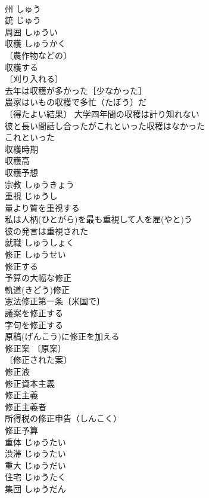 \documentclass[8pt]{extreport}
\begin{document}
\begin{CJK}{UTF8}{min}
\\	州	しゅう	
\\	銃	じゅう	
\\	周囲	しゅうい	
\\	収穫	しゅうかく	
\\	〔農作物などの〕
\\	収穫する 
\\	〔刈り入れる〕
\\	去年は収穫が多かった［少なかった］ 
\\	農家はいもの収穫で多忙（たぼう）だ 
\\	〔得たよい結果〕 大学四年間の収穫は計り知れない 
\\	彼と長い間話し合ったがこれといった収穫はなかった 
\\	これといった 
\\	収穫時期 
\\	収穫高 
\\	収穫予想 
\\	宗教	しゅうきょう	
\\	重視	じゅうし	
\\	量より質を重視する 
\\	私は人柄(ひとがら)を最も重視して人を雇(やと)う 
\\	彼の発言は重視された 
\\	就職	しゅうしょく	
\\	修正	しゅうせい	
\\	修正する 
\\	予算の大幅な修正 
\\	軌道(きどう)修正 
\\	憲法修正第一条〔米国で〕 
\\	議案を修正する 
\\	字句を修正する 
\\	原稿(げんこう)に修正を加える 
\\	修正案 〔原案〕
\\	〔修正された案〕
\\	修正液 
\\	修正資本主義 
\\	修正主義 
\\	修正主義者 
\\	所得税の修正申告（しんこく） 
\\	修正予算 
\\	重体	じゅうたい	
\\	渋滞	じゅうたい	
\\	重大	じゅうだい	
\\	住宅	じゅうたく	
\\	集団	しゅうだん	

\end{CJK}
\end{document}
